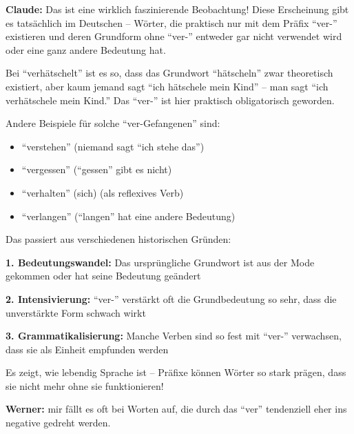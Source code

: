 \documentclass[11pt,a4paper]{scrartcl}
\begin{document}
\begin{claudebox}
\textbf{Claude:} Das ist eine wirklich faszinierende Beobachtung! Diese Erscheinung gibt es tatsächlich im Deutschen -- Wörter, die praktisch nur mit dem Präfix "`ver-"' existieren und deren Grundform ohne "`ver-"' entweder gar nicht verwendet wird oder eine ganz andere Bedeutung hat.

Bei "`verhätschelt"' ist es so, dass das Grundwort "`hätscheln"' zwar theoretisch existiert, aber kaum jemand sagt "`ich hätschele mein Kind"' -- man sagt "`ich verhätschele mein Kind."' Das "`ver-"' ist hier praktisch obligatorisch geworden.

Andere Beispiele für solche "`ver-Gefangenen"' sind:
\begin{itemize}
\item "`verstehen"' (niemand sagt "`ich stehe das"')
\item "`vergessen"' ("`gessen"' gibt es nicht)
\item "`verhalten"' (sich) (als reflexives Verb)
\item "`verlangen"' ("`langen"' hat eine andere Bedeutung)
\end{itemize}

Das passiert aus verschiedenen historischen Gründen:

\textbf{1. Bedeutungswandel:} Das ursprüngliche Grundwort ist aus der Mode gekommen oder hat seine Bedeutung geändert

\textbf{2. Intensivierung:} "`ver-"' verstärkt oft die Grundbedeutung so sehr, dass die unverstärkte Form schwach wirkt

\textbf{3. Grammatikalisierung:} Manche Verben sind so fest mit "`ver-"' verwachsen, dass sie als Einheit empfunden werden

Es zeigt, wie lebendig Sprache ist -- Präfixe können Wörter so stark prägen, dass sie nicht mehr ohne sie funktionieren!
\end{claudebox}

\begin{humanbox}
\textbf{Werner:} mir fällt es oft bei Worten auf, die durch das "`ver"' tendenziell eher ins negative gedreht werden.
\end{humanbox}
\end{document}
